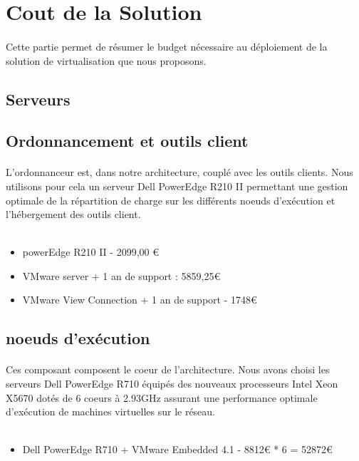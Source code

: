\section{Cout de la Solution}

\paragraph{} Cette partie permet de résumer le budget nécessaire au déploiement de la solution de virtualisation que nous proposons. 

\subsection{Serveurs}


\subsection{Ordonnancement et outils client}

\paragraph{} L'ordonnanceur est, dans notre architecture, couplé avec les outils clients. Nous utilisons pour cela un serveur Dell PowerEdge R210 II permettant une gestion optimale de la répartition de charge sur les différents noeuds d'exécution et l'hébergement des outils client.
\\~
\begin{itemize}
	\item powerEdge R210 II - 2099,00 €
	\item VMware server + 1 an de support : 5859,25€
	\item VMware View Connection + 1 an de support - 1748€
\end{itemize}

\subsection{noeuds d’exécution}

\paragraph{} Ces composant composent le coeur de l'architecture. Nous avons choisi les serveurs Dell PowerEdge R710 équipés des nouveaux processeurs Intel Xeon X5670 dotés de 6 coeurs à 2.93GHz assurant une performance optimale d'exécution de machines virtuelles sur le réseau.
\\~
\begin{itemize}
 	\item Dell PowerEdge R710 + VMware Embedded 4.1 - 8812€ * 6 = 52872€
\end{itemize}

